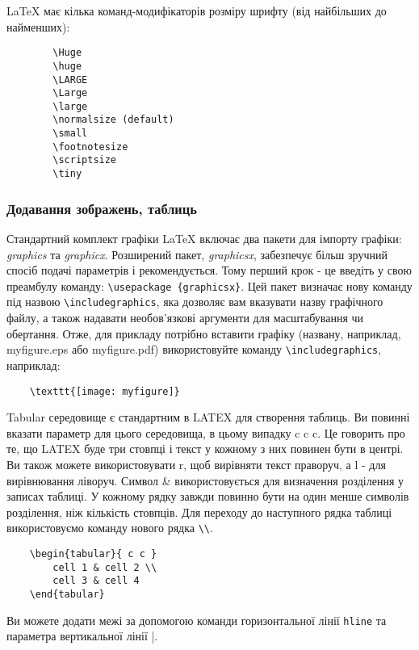 LaTeX має кілька команд-модифікаторів розміру шрифту (від найбільших до найменших):

\begin{lstlisting}
		\Huge
		\huge
		\LARGE
		\Large
		\large
		\normalsize (default)
		\small
		\footnotesize
		\scriptsize
		\tiny
\end{lstlisting}

\subsubsection{Додавання зображень, таблиць}

Стандартний комплект графіки LaTeX включає два пакети для імпорту графіки:
\textit{graphics} та \textit{graphicx}. Розширений пакет, \textit{graphicsx}, забезпечує більш зручний спосіб подачі параметрів і рекомендується. Тому перший крок - це введіть у свою преамбулу команду:
\verb|\usepackage {graphicsx}|. Цей пакет визначає нову команду під назвою \verb|\includegraphics|, яка дозволяє вам вказувати назву графічного файлу, а також надавати необов'язкові аргументи для масштабування чи обертання. Отже, для прикладу потрібно вставити графіку (названу, наприклад, myfigure.eps
або myfigure.pdf) використовуйте команду \verb|\includegraphics|, наприклад:

\begin{lstlisting}
	\texttt{[image: myfigure]}
\end{lstlisting}


Tabular середовище є стандартним в LATEX для створення таблиць. Ви повинні вказати параметр для цього середовища, в цьому випадку {c c c}. Це говорить про те, що LATEX буде три стовпці і текст у кожному з них повинен бути в центрі. Ви також можете використовувати r, щоб вирівняти текст праворуч, а l - для вирівнювання ліворуч. Символ \& використовується для визначення розділення у записах таблиці. У кожному рядку завжди повинно бути на один менше символів розділення, ніж кількість стовпців. Для переходу до наступного рядка таблиці використовуємо команду нового рядка \verb|\\|.

\begin{lstlisting}
	\begin{tabular}{ c c }
		cell 1 & cell 2 \\
		cell 3 & cell 4 
	\end{tabular}
\end{lstlisting}

Ви можете додати межі за допомогою команди горизонтальної лінії \verb|hline| та параметра вертикальної лінії |.

